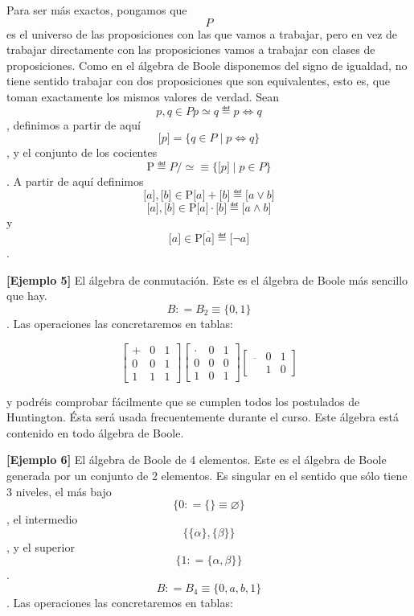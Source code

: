 \documentclass[
]{article}
\begin{document}
\begin{enumerate}
  Para ser más exactos, pongamos que \[P\] es el universo de las
  proposiciones con las que vamos a trabajar, pero en vez de trabajar
  directamente con las proposiciones vamos a trabajar con clases de
  proposiciones. Como en el álgebra de Boole disponemos del signo de
  igualdad, no tiene sentido trabajar con dos proposiciones que son
  equivalentes, esto es, que toman exactamente los mismos valores de
  verdad. Sean \[p,{q \in P}{p \simeq q} ≝ p\Leftrightarrow q\],
  definimos a partir de aquí
  \[{\lbrack p\rbrack} = {\{{{q \in P} \mid p\Leftrightarrow q}\}}\], y
  el conjunto de los cocientes
  \[\mathtt{\mathrm{P}} ≝ {{{P/} \simeq} \equiv {\{{{\lbrack p\rbrack} \mid {p \in P}}\}}}\].
  A partir de aquí definimos
  \[{\lbrack a\rbrack},{{\lbrack b\rbrack} \in \mathtt{\mathrm{P}}}{{\lbrack a\rbrack} + {\lbrack b\rbrack}} ≝ {\lbrack{a \vee b}\rbrack}\]
  \[{\lbrack a\rbrack},{{\lbrack b\rbrack} \in \mathtt{\mathrm{P}}}{{\lbrack a\rbrack} \cdot {\lbrack b\rbrack}} ≝ {\lbrack{a \land b}\rbrack}\]y
  \[{{\lbrack a\rbrack} \in \mathtt{\mathrm{P}}}\overline{\lbrack a\rbrack} ≝ {\lbrack{\neg a}\rbrack}\].

  \textbf{{[}Ejemplo 5{]}} El álgebra de conmutación. Este es el álgebra
  de Boole más sencillo que hay. \[B{{: = B_{2}} \equiv {\{{0,1}\}}}\].
  Las operaciones las concretaremos en tablas:

  \[\begin{bmatrix}
   + & 0 & 1 \\
  0 & 0 & 1 \\
  1 & 1 & 1
  \end{bmatrix}\begin{bmatrix}
   \cdot & 0 & 1 \\
  0 & 0 & 0 \\
  1 & 0 & 1
  \end{bmatrix}\begin{bmatrix}
  \overline{} & 0 & 1 \\
   & 1 & 0
  \end{bmatrix}\]

  y podréis comprobar fácilmente que se cumplen todos los postulados de
  Huntington. Ésta será usada frecuentemente durante el curso. Este
  álgebra está contenido en todo álgebra de Boole.

  \textbf{{[}Ejemplo 6{]}} El álgebra de Boole de 4 elementos. Este es
  el álgebra de Boole generada por un conjunto de 2 elementos. Es
  singular en el sentido que sólo tiene 3 niveles, el más bajo
  \[\{{0{{: = {\{\}}} \equiv \varnothing}}\}\], el intermedio
  \[\{{{\{\alpha\}},{\{\beta\}}}\}\], y el superior
  \[\{{1{: = {\{{\alpha,\beta}\}}}}\}\].
  \[B{{: = B_{4}} \equiv {\{{0,a,b,1}\}}}\]. Las operaciones las
  concretaremos en tablas:


\end{enumerate}
\end{document}
